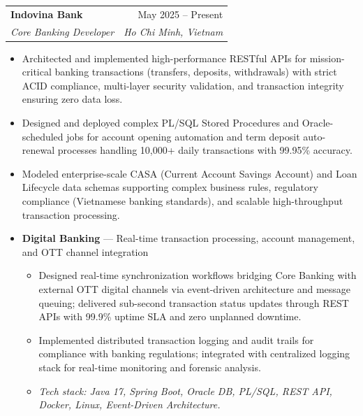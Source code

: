 \documentclass[letterpaper,11pt]{article}
\makeatletter
\newcommand{\resumeItem}[1]{
  \item\small{{#1\vspace{-1pt}}}
}
\newcommand{\resumeSubheading}[4]{
  \vspace{-2pt}\item
    \begin{tabular*}{0.97\textwidth}[t]{l@{\extracolsep{\fill}}r}
      \textbf{\small #1} & \small #2 \\
      \textit{\small\color{accent} #3} & \textit{\small #4} \\
    \end{tabular*}\vspace{-5pt}
}
\newcommand{\techStack}[1]{%
  \vspace{1pt}
  {\small\textit{Tech stack: #1}}%
}
\newcommand{\resumeItemListStart}{%
  \begin{itemize}[leftmargin=0.22in, topsep=2pt, parsep=0pt, partopsep=0pt, itemsep=2pt]%
}
\newcommand{\resumeItemListEnd}{\end{itemize}\vspace{-2pt}}
\newenvironment{projectBlock}[2]{%
  \vspace{-4pt}
  \begin{itemize}[leftmargin=0.22in, label={}, topsep=0pt, parsep=0pt, itemsep=0pt]
  \item \small\textbf{#1} --- #2
  \begin{itemize}[leftmargin=0.18in, topsep=1pt, parsep=0pt, itemsep=1pt]
}{%
  \end{itemize}
  \end{itemize}
  \vspace{-2pt}
}
\makeatother
\begin{document}
  \resumeSubheading
    {Indovina Bank}{May 2025 -- Present}
    {Core Banking Developer}{Ho Chi Minh, Vietnam}
  \resumeItemListStart
    \resumeItem{Architected and implemented high-performance RESTful APIs for mission-critical banking transactions (transfers, deposits, withdrawals) with strict ACID compliance, multi-layer security validation, and transaction integrity ensuring zero data loss.}
    \resumeItem{Designed and deployed complex PL/SQL Stored Procedures and Oracle-scheduled jobs for account opening automation and term deposit auto-renewal processes handling 10,000+ daily transactions with 99.95\% accuracy.}
    \resumeItem{Modeled enterprise-scale CASA (Current Account Savings Account) and Loan Lifecycle data schemas supporting complex business rules, regulatory compliance (Vietnamese banking standards), and scalable high-throughput transaction processing.}
  \resumeItemListEnd

  \begin{projectBlock}{Digital Banking}{Real-time transaction processing, account management, and OTT channel integration}
    \resumeItem{Designed real-time synchronization workflows bridging Core Banking with external OTT digital channels via event-driven architecture and message queuing; delivered sub-second transaction status updates through REST APIs with 99.9\% uptime SLA and zero unplanned downtime.}
    \resumeItem{Implemented distributed transaction logging and audit trails for compliance with banking regulations; integrated with centralized logging stack for real-time monitoring and forensic analysis.}
    \item \techStack{Java 17, Spring Boot, Oracle DB, PL/SQL, REST API, Docker, Linux, Event-Driven Architecture.}
  \end{projectBlock}
\end{document}
